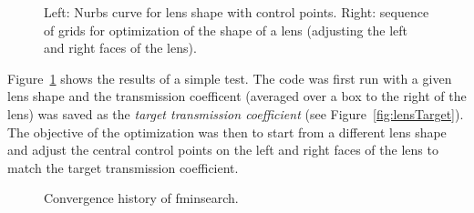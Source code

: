 \documentclass[11pt]{article}
\begin{document}
{%
%
\newcommand{\figWidth}{4.9cm}%
\newcommand{\figWidtha}{8cm}%
\newcommand{\trimfig}[2]{\trimw{#1}{#2}{.3}{.3}{.37}{.37}}
\newcommand{\trimfiga}[2]{\trimh{#1}{#2}{.3}{.35}{.0}{.1}}
\begin{figure}[htb]
\begin{center}
\end{center}
\caption{Left: Nurbs curve for lens shape with control points.
  Right: sequence of grids for optimization of the shape of a lens (adjusting the left and right faces of the lens).}
  \label{fig:lensGridOptimization}
\end{figure}
}


Figure~\ref{fig:lensGridOptimization} shows the results of a simple test.
The code was first run with a given lens shape and the transmission coefficent (averaged over a box to the right of the lens)
was saved as the {\em target transmission coefficient} (see Figure~\ref{fig:lensTarget}). 
The objective of the optimization was then to start from a different lens shape and adjust the
central control points on the left and right faces of the lens to match the target transmission coefficient. 

{%
%
\newcommand{\figWidth}{6cm}%
\newcommand{\trimfig}[2]{\trimh{#1}{#2}{.0}{.0}{.0}{.0}}
\begin{figure}[htb]
\begin{center}
\end{center}
  \caption{Convergence history of fminsearch.}
  \label{fig:lensFminsearch}
\end{figure}
}
\end{document}
